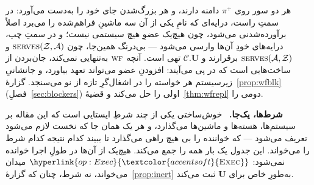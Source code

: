 \documentclass[10pt,oneside,openany]{book}
\newcommand{\uses}{\mathbf{U}}
\newcommand{\serves}{\op{serves}}
\newcommand{\WF}{\op{wf}}
\newcommand{\Corr}{\mathcal{C}}
\newcommand{\Zenv}{\mathcal{Z}}
\newcommand{\Adv}{\mathcal{A}}
\newcommand{\op}[1]{\textnormal{\textsc{#1}}}
\newcommand{\opl}[1]{\hyperlink{op:#1}{\textcolor{accentsoft}{\op{#1}}}}
\newcommand{\heading}[1]{\medskip\par\noindent\textcolor{accent}{\textbf{#1.}}\ }
\theoremstyle{accentdef}
\theoremstyle{accentplain}
\begin{document}
هر دو سور روی $\pi^{+}$ دامنه دارند، و هر بزرگ‌شدن جای خود را به‌دست
می‌آورد: در سمتِ راست، درایه‌ای که نامِ یکی از آن سه ماشینِ فراهم‌شده را
می‌برد اصلاً برآورده‌شدنی می‌شود، چون هیچ‌یک عضوِ هیچ سیستمی نیست؛ و در
سمتِ چپ، درایه‌های خودِ آن‌ها وارسی می‌شود --- بی‌درنگ همین‌جا، چون
$\serves(\Zenv,\Adv)$ و $\serves(\Adv,\Zenv)$ برقرارند و $\Corr.\uses$
تهی است. آنچه $\WF$ به‌تنهایی نمی‌کند، جان‌بردن از ساخت‌هایی است که در پی
می‌آیند: افزودنِ عضو می‌تواند تعهد بیاورد، و جانشانیِ زیرسیستم هر خواسته
را در اشغال‌گرِ تازه از نو می‌سنجد. گزارهٔ~\ref{prop:wfblk}
(فصلِ~\ref{sec:blockers}) اولی را حل می‌کند و قضیهٔ~\ref{thm:wfrepl}
دومی را.

\heading{شرط‌ها، یک‌جا} خوش‌ساختی یکی از چند شرطِ ایستایی است که این مقاله
بر سیستم‌ها، هسته‌ها و ماشین‌ها می‌گذارد، و هر یک همان جا که نخست لازم
می‌شود تعریف می‌شود --- که خواننده را بی هیچ راهی می‌گذارد تا ببیند کدام
نتیجه کدام شرط را می‌خواند. این جدول یک بار همه را جمع می‌کند. هیچ‌یک از
آن‌ها در طولِ اجرا خوانده نمی‌شود: $\opl{Exec}$ میدان می‌خواند، نه شرط،
چنان که گزارهٔ~\ref{prop:inert} به‌طورِ خاص برای $\uses$ ثبت می‌کند.
\end{document}
